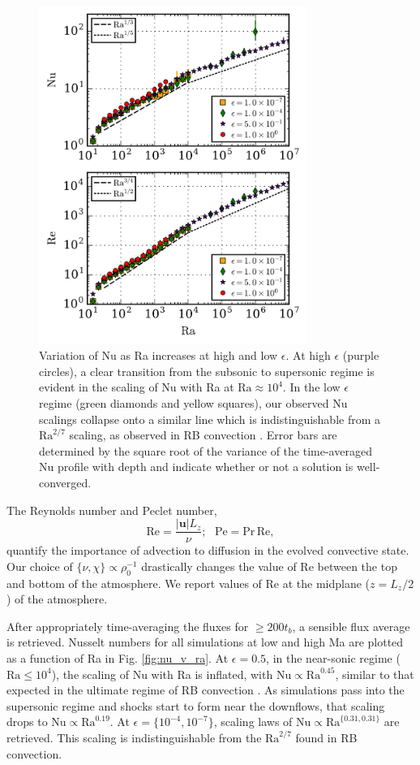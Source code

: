 \documentclass[aps, prl, twocolumn, nofootinbib, groupedaddress, amsfonts, amssymb, amsmath]{revtex4-1}
\begin{document}
\begin{figure}[t]
\includegraphics[width=3.4375in]{./figs/re_and_nu_v_Ra.png}
\caption{
Variation of Nu as Ra increases at high and low $\epsilon$. 
At high $\epsilon$ (purple circles), 
a clear transition from the subsonic to supersonic regime is evident in the scaling
of Nu with Ra at $\text{Ra} \approx 10^4$.  In the low $\epsilon$ regime (green diamonds and yellow squares), 
our observed Nu scalings collapse onto a similar line which is
indistinguishable from a $\text{Ra}^{2/7}$ scaling, 
as observed in RB convection \cite{johnston&doering2009}.  Error bars are determined
 by the square root of the variance of the time-averaged Nu profile with depth and 
 indicate whether or not a solution is well-converged.
}
\end{figure}

The Reynolds number and Peclet number,
\begin{equation}
\text{Re} = \frac{|\bm{u}| L_z}{\nu};\,\,\,\,\text{Pe} = \text{Pr}\,\text{Re},
\end{equation}
quantify the importance of advection to diffusion in the evolved
convective state.  Our choice of $\{\nu,\chi\}\propto \rho_0^{-1}$ drastically changes
the value of Re between the top and bottom of the atmosphere.  We report values of
Re at the midplane ($z=L_z/2$) of the atmosphere.


After appropriately time-averaging the fluxes for $\geq 200 t_b$, 
a sensible flux average is retrieved.  Nusselt numbers for
all simulations at low and high Ma are plotted as a function of Ra in Fig. \ref{fig:nu_v_ra}.  
At $\epsilon = 0.5$, in the near-sonic
regime ($\text{Ra} \leq 10^4$), the scaling of Nu with Ra is inflated,
with $\text{Nu} \propto \text{Ra}^{0.45}$, similar to that expected in the
ultimate regime of RB convection \cite{ahlers&all2009}.  As simulations
pass into the supersonic regime and shocks start to form near the downflows,
that scaling drops to $\text{Nu} \propto \text{Ra}^{0.19}$.  
At $\epsilon = \{10^{-4}, 10^{-7}\}$,
scaling laws of $\text{Nu} \propto \text{Ra}^{\{0.31, 0.31\}}$ are retrieved. 
This scaling is indistinguishable from the $\text{Ra}^{2/7}$ found in RB
convection.
\end{document}
